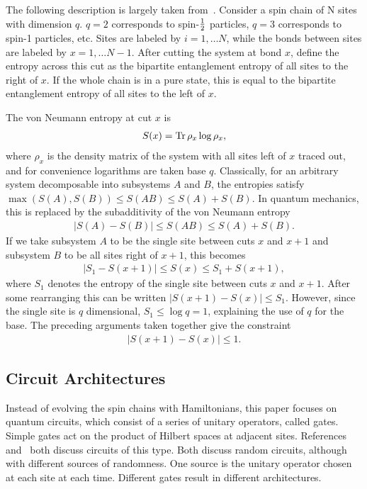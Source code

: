 The following description is largely taken from~\cite{Nahum2017}. Consider a spin chain of N sites with dimension $q$. $q=2$ corresponds to spin-$\frac{1}{2}$ particles, $q=3$ corresponds to spin-1 particles, etc. Sites are labeled by $i=1,\dots N$, while the bonds between sites are labeled by $x = 1,\dots N-1$. After cutting the system at bond $x$, define the entropy across this cut as the bipartite entanglement entropy of all sites to the right of $x$. If the whole chain is in a pure state, this is equal to the bipartite entanglement entropy of all sites to the left of $x$.

The von Neumann entropy at cut $x$ is
\begin{align}
S(x) = \-\operatorname{Tr}\rho_x\log\rho_x, \label{eqn:vonneu}
\end{align}
where $\rho_x$ is the density matrix of the system with all sites left of $x$ traced out, and for convenience logarithms are taken base $q$. Classically, for an arbitrary system decomposable into subsystems $A$ and $B$, the entropies satisfy $\max(S(A), S(B)) \leq S(AB)\leq S(A) + S(B)$. In quantum mechanics, this is replaced by the subadditivity of the von Neumann entropy 
\begin{align}
\left|S(A)-S(B)\right| \leq S(AB)\leq S(A) + S(B). \label{eqn:subadd}
\end{align}
If we take subsystem $A$ to be the single site between cuts $x$ and $x+1$ and subsystem $B$ to be all sites right of $x+1$, this becomes
\begin{align}
\left|S_1 - S(x+1)\right| \leq S(x) \leq S_1 + S(x+1),
\end{align}
where $S_1$ denotes the entropy of the single site between cuts $x$ and $x+1$. After some rearranging this can be written $\left|S(x+1) - S(x)\right| \leq S_1$. However, since the single site is $q$ dimensional, $S_1 \leq \log q = 1$, explaining the use of $q$ for the base. The preceding arguments taken together give the constraint
\begin{align}
\left|S(x+1) - S(x)\right| \leq 1. \label{eqn:offbyone}
\end{align}

\subsection{Circuit Architectures} \emph{}\label{sub:arch}

Instead of evolving the spin chains with Hamiltonians, this paper focuses on quantum circuits, which consist of a series of unitary operators, called gates. Simple gates act on the product of Hilbert spaces at adjacent sites. References~\cite{Keyserlingk} and~\cite{Nahum2017} both discuss circuits of this type. Both discuss random circuits, although with different sources of randomness. One source is the unitary operator chosen at each site at each time. Different gates result in different architectures. 

